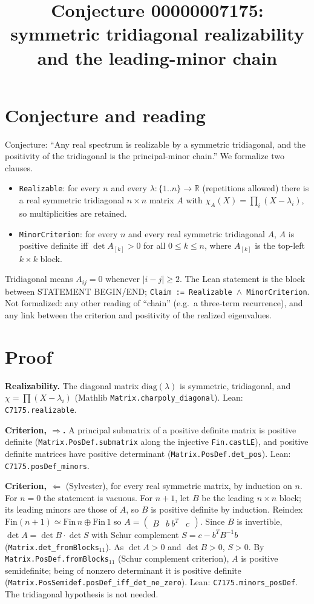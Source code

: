 \documentclass[11pt]{article}
\title{Conjecture 00000007175: symmetric tridiagonal realizability and the leading-minor chain}
\date{}
\begin{document}
\maketitle
\section*{Conjecture and reading}
Conjecture: ``Any real spectrum is realizable by a symmetric tridiagonal, and the positivity of the tridiagonal is the principal-minor chain.'' We formalize two clauses.
\begin{itemize}
\item \texttt{Realizable}: for every $n$ and every $\lambda:\{1..n\}\to\mathbb R$ (repetitions allowed) there is a real symmetric tridiagonal $n\times n$ matrix $A$ with $\chi_A(X)=\prod_i (X-\lambda_i)$, so multiplicities are retained.
\item \texttt{MinorCriterion}: for every $n$ and every real symmetric tridiagonal $A$, $A$ is positive definite iff $\det A_{[k]}>0$ for all $0\le k\le n$, where $A_{[k]}$ is the top-left $k\times k$ block.
\end{itemize}
Tridiagonal means $A_{ij}=0$ whenever $|i-j|\ge 2$. The Lean statement is the block between STATEMENT BEGIN/END; \texttt{Claim := Realizable $\wedge$ MinorCriterion}. Not formalized: any other reading of ``chain'' (e.g.\ a three-term recurrence), and any link between the criterion and positivity of the realized eigenvalues.

\section*{Proof}
\textbf{Realizability.} The diagonal matrix $\mathrm{diag}(\lambda)$ is symmetric, tridiagonal, and $\chi=\prod(X-\lambda_i)$ (Mathlib \texttt{Matrix.charpoly\_diagonal}). Lean: \texttt{C7175.realizable}.

\textbf{Criterion, $\Rightarrow$.} A principal submatrix of a positive definite matrix is positive definite (\texttt{Matrix.PosDef.submatrix} along the injective \texttt{Fin.castLE}), and positive definite matrices have positive determinant (\texttt{Matrix.PosDef.det\_pos}). Lean: \texttt{C7175.posDef\_minors}.

\textbf{Criterion, $\Leftarrow$} (Sylvester), for every real symmetric matrix, by induction on $n$. For $n=0$ the statement is vacuous. For $n+1$, let $B$ be the leading $n\times n$ block; its leading minors are those of $A$, so $B$ is positive definite by induction. Reindex $\mathrm{Fin}(n+1)\simeq \mathrm{Fin}\,n\oplus\mathrm{Fin}\,1$ so $A=\begin{pmatrix}B&b\ b^T&c\end{pmatrix}$. Since $B$ is invertible, $\det A=\det B\cdot\det S$ with Schur complement $S=c-b^TB^{-1}b$ (\texttt{Matrix.det\_fromBlocks$_{11}$}). As $\det A>0$ and $\det B>0$, $S>0$. By \texttt{Matrix.PosDef.fromBlocks$_{11}$} (Schur complement criterion), $A$ is positive semidefinite; being of nonzero determinant it is positive definite (\texttt{Matrix.PosSemidef.posDef\_iff\_det\_ne\_zero}). Lean: \texttt{C7175.minors\_posDef}. The tridiagonal hypothesis is not needed.
\end{document}
